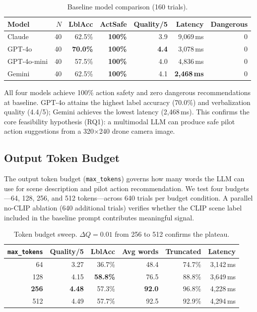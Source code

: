 \documentclass[journal]{IEEEtran}
\begin{document}
\begin{table}[!t]
  \caption{Baseline model comparison (160 trials).}
  \label{tab:baseline}
  \centering
  \small
  \begin{tabular}{lrrrrrr}
    \toprule
    Model & $N$ & LblAcc & ActSafe & Quality/5 & Latency & Dangerous \\
    \midrule
    Claude      & 40 & 62.5\% & \textbf{100\%} & 3.9 & 9,069\,ms & 0 \\
    GPT-4o      & 40 & \textbf{70.0\%} & \textbf{100\%} & \textbf{4.4} & 3,078\,ms & 0 \\
    GPT-4o-mini & 40 & 57.5\% & \textbf{100\%} & 4.0 & 4,836\,ms & 0 \\
    Gemini      & 40 & 62.5\% & \textbf{100\%} & 4.1 & \textbf{2,468\,ms} & 0 \\
    \bottomrule
  \end{tabular}
\end{table}

All four models achieve 100\% action safety and zero dangerous
recommendations at baseline.
GPT-4o attains the highest label accuracy (70.0\%) and verbalization quality
(4.4/5); Gemini achieves the lowest latency (2,468\,ms).
This confirms the core feasibility hypothesis (RQ1): a multimodal LLM can
produce safe pilot action suggestions from a 320$\times$240 drone camera
image.

\subsection{Output Token Budget}
\label{sec:v_tokens}

The output token budget (\texttt{max\_tokens}) governs how many words the
LLM can use for scene description and pilot action recommendation.
We test four budgets---64, 128, 256, and 512 tokens---across 640 trials per
budget condition.
A parallel no-CLIP ablation (640 additional trials) verifies whether the
CLIP scene label included in the baseline prompt contributes meaningful
signal.

\begin{table}[!t]
  \caption{Token budget sweep. $\Delta Q = 0.01$ from 256 to 512 confirms the
           plateau.}
  \label{tab:tokens}
  \centering
  \small
  \begin{tabular}{rrrrrr}
    \toprule
    \texttt{max\_tokens} & Quality/5 & LblAcc & Avg words & Truncated & Latency \\
    \midrule
    64           & 3.27 & 36.7\% & 48.4 & 74.7\%  & 3,142\,ms \\
    128          & 4.15 & \textbf{58.8\%} & 76.5 & 88.8\%  & 3,649\,ms \\
    \textbf{256} & \textbf{4.48} & 57.3\% & \textbf{92.0} & 96.8\% & 4,228\,ms \\
    512          & 4.49 & 57.7\% & 92.5 & 92.9\%  & 4,294\,ms \\
    \bottomrule
  \end{tabular}
\end{table}
\end{document}
